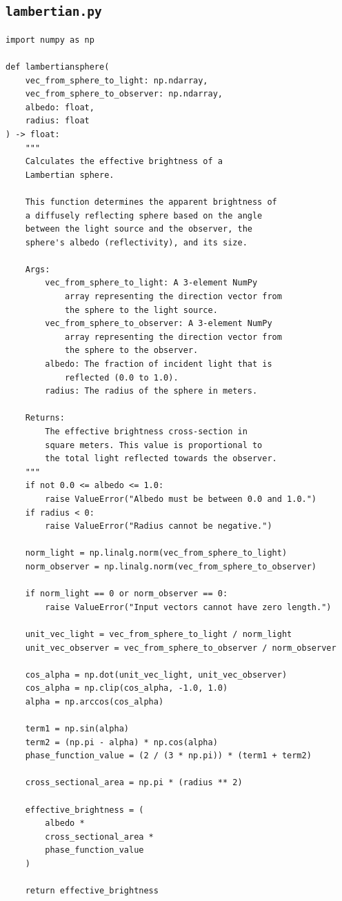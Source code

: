 \documentclass[11pt]{article}
\begin{document}
\subsection{\texttt{lambertian.py}}
\begin{Verbatim}
import numpy as np

def lambertiansphere(
    vec_from_sphere_to_light: np.ndarray,
    vec_from_sphere_to_observer: np.ndarray,
    albedo: float,
    radius: float
) -> float:
    """
    Calculates the effective brightness of a
    Lambertian sphere.

    This function determines the apparent brightness of
    a diffusely reflecting sphere based on the angle
    between the light source and the observer, the
    sphere's albedo (reflectivity), and its size.

    Args:
        vec_from_sphere_to_light: A 3-element NumPy
            array representing the direction vector from
            the sphere to the light source.
        vec_from_sphere_to_observer: A 3-element NumPy
            array representing the direction vector from
            the sphere to the observer.
        albedo: The fraction of incident light that is
            reflected (0.0 to 1.0).
        radius: The radius of the sphere in meters.

    Returns:
        The effective brightness cross-section in
        square meters. This value is proportional to
        the total light reflected towards the observer.
    """
    if not 0.0 <= albedo <= 1.0:
        raise ValueError("Albedo must be between 0.0 and 1.0.")
    if radius < 0:
        raise ValueError("Radius cannot be negative.")

    norm_light = np.linalg.norm(vec_from_sphere_to_light)
    norm_observer = np.linalg.norm(vec_from_sphere_to_observer)

    if norm_light == 0 or norm_observer == 0:
        raise ValueError("Input vectors cannot have zero length.")

    unit_vec_light = vec_from_sphere_to_light / norm_light
    unit_vec_observer = vec_from_sphere_to_observer / norm_observer

    cos_alpha = np.dot(unit_vec_light, unit_vec_observer)
    cos_alpha = np.clip(cos_alpha, -1.0, 1.0)
    alpha = np.arccos(cos_alpha)

    term1 = np.sin(alpha)
    term2 = (np.pi - alpha) * np.cos(alpha)
    phase_function_value = (2 / (3 * np.pi)) * (term1 + term2)

    cross_sectional_area = np.pi * (radius ** 2)

    effective_brightness = (
        albedo *
        cross_sectional_area *
        phase_function_value
    )

    return effective_brightness
\end{Verbatim}
\end{document}
